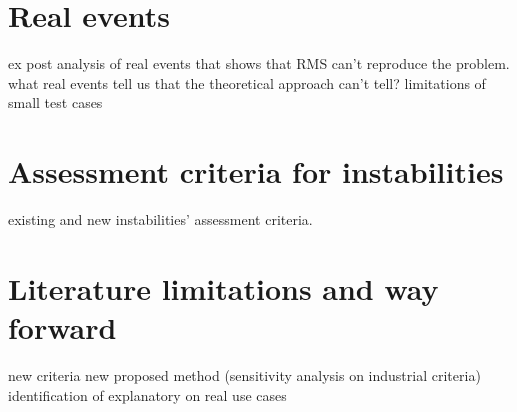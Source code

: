 \documentclass{report}
\begin{document}
\section{Real events}
ex post analysis of real events that shows that RMS can't reproduce the problem.
what real events tell us that the theoretical approach can't tell? limitations of small test cases
\section{Assessment criteria for instabilities}
existing and new instabilities' assessment criteria. 

\section*{Literature limitations and way forward}
new criteria 
new proposed method (sensitivity analysis on industrial criteria)
identification of explanatory on real use cases




\vspace{12pt}
\end{document}
